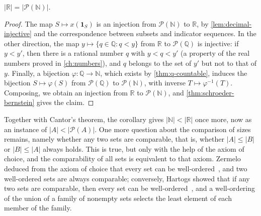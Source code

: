 \begin{corollary}
\label{cor:r-power-set}
$|\mathbb R|=|\mathcal P(\mathbb N)|$.
\end{corollary}

\begin{proof}
The map $S\mapsto x(\mathbf 1_S)$ is an injection from $\mathcal P(\mathbb N)$ to $\mathbb R$, by \cref{lem:decimal-injective} and the correspondence between subsets and indicator sequences. In the other direction, the map $y\mapsto\{q\in\mathbb Q: q<y\}$ from $\mathbb R$ to $\mathcal P(\mathbb Q)$ is injective: if $y<y'$, then there is a rational number $q$ with $y<q<y'$ (a property of the real numbers proved in \cref{ch:numbers}), and $q$ belongs to the set of $y'$ but not to that of $y$. Finally, a bijection $\varphi\colon\mathbb Q\to\mathbb N$, which exists by \cref{thm:q-countable}, induces the bijection $S\mapsto\varphi(S)$ from $\mathcal P(\mathbb Q)$ to $\mathcal P(\mathbb N)$, with inverse $T\mapsto\varphi^{-1}(T)$. Composing, we obtain an injection from $\mathbb R$ to $\mathcal P(\mathbb N)$, and \cref{thm:schroeder-bernstein} gives the claim.
\end{proof}

Together with Cantor's theorem, the corollary gives $|\mathbb N|<|\mathbb R|$ once more, now as an instance of $|A|<|\mathcal P(A)|$. One more question about the comparison of sizes remains, namely whether any two sets are comparable, that is, whether $|A|\le|B|$ or $|B|\le|A|$ always holds. This is true, but only with the help of the axiom of choice, and the comparability of all sets is equivalent to that axiom. Zermelo deduced from the axiom of choice that every set can be well-ordered~\cite{zermelo1904}, and two well-ordered sets are always comparable; conversely, Hartogs showed that if any two sets are comparable, then every set can be well-ordered~\cite{hartogs1915}, and a well-ordering of the union of a family of nonempty sets selects the least element of each member of the family.

